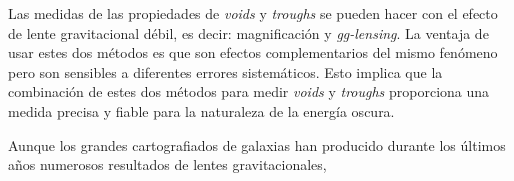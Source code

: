 Las medidas de las propiedades de {\it voids} y {\it troughs} se pueden hacer con el efecto de lente gravitacional d\'ebil, es decir: magnificaci\'on y {\it gg-lensing}. La ventaja de usar estes dos m\'etodos es que son efectos complementarios del mismo fen\'omeno pero son sensibles a diferentes errores sistem\'aticos. Esto implica que la combinaci\'on de estes dos m\'etodos para medir {\it voids} y {\it troughs} proporciona una medida precisa y fiable para la naturaleza de la energ\'ia oscura.
\newline

Aunque los grandes cartografiados de galaxias han producido durante los \'ultimos a\~nos numerosos resultados de lentes gravitacionales, 